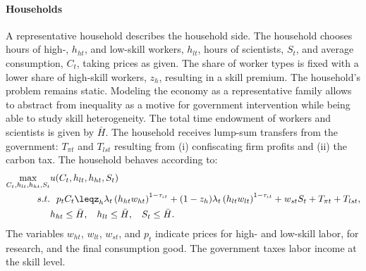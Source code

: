 \paragraph{Households}
A representative household describes the household side.
The household chooses hours of high-, $h_{ht}$, and low-skill workers, $h_{lt}$, hours of scientists, $S_t$, and average consumption, $C_t$, taking prices as given. The share of worker types is fixed with a lower share of high-skill workers, $z_h$, resulting in a skill premium. The household's problem remains static. Modeling the economy as a representative family allows to abstract from inequality as a motive for government intervention while being able to study skill heterogeneity. The total time endowment of workers and scientists is given by $\bar{H}$. %
The household receives lump-sum transfers from the government: $T_{\pi t}$ and $T_{lst}$ resulting from (i) confiscating firm profits and (ii) the carbon tax. The household behaves according to:
\begin{align*}
\underset{C_{t}, h_{lt}, h_{ht}, S_t}{\max}&
u(C_{t}, h_{lt}, h_{ht}, S_t)\\
s.t.& \ \ p_{t}C_{t}\leq%
z_h\lambda_t \left(h_{ht}w_{ht}\right)^{1-\tau_{\iota t}}+(1-z_h)\lambda_t\left(h_{lt}w_{lt}\right)^{1-\tau_{\iota t}}+w_{st}S_t+T_{\pi t}+T_{lst},\\
\ & h_{ht}\leq \bar{H},\ \hspace{2mm} h_{lt}\leq \bar{H},\ \hspace{2mm}  S_{t}\leq \bar{H}.
\end{align*}
The variables $w_{ht}$, $w_{lt}$, $w_{st}$, and $p_{t}$ indicate prices for high- and low-skill labor, for research, and the final consumption good.
The government taxes labor income at the skill level. 

